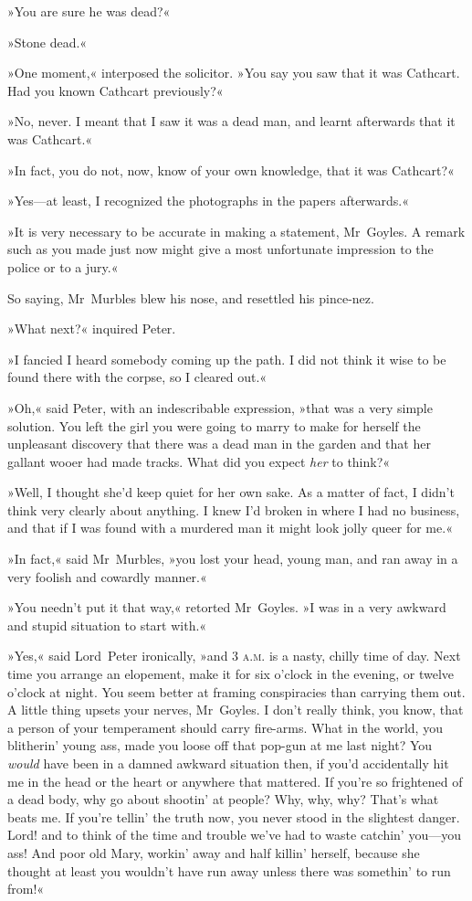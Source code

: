 »You are sure he was dead?«

»Stone dead.«

»One moment,« interposed the solicitor. »You say you saw that it was Cathcart. Had you known Cathcart previously?«

»No, never. I meant that I saw it was a dead man, and learnt afterwards that it was Cathcart.«

»In fact, you do not, now, know of your own knowledge, that it was Cathcart?«

»Yes—at least, I recognized the photographs in the papers afterwards.«

»It is very necessary to be accurate in making a statement, Mr~Goyles.  A remark such as you made just now might give a most unfortunate impression to the police or to a jury.«

So saying, Mr~Murbles blew his nose, and resettled his pince-nez.

»What next?« inquired Peter.

»I fancied I heard somebody coming up the path. I did not think it wise to be found there with the corpse, so I cleared out.«

»Oh,« said Peter, with an indescribable expression, »that was a very simple solution. You left the girl you were going to marry to make for herself the unpleasant discovery that there was a dead man in the garden and that her gallant wooer had made tracks. What did you expect \textit{her} to think?«

»Well, I thought she'd keep quiet for her own sake. As a matter of fact, I didn't think very clearly about anything. I knew I'd broken in where I had no business, and that if I was found with a murdered man it might look jolly queer for me.«

»In fact,« said Mr~Murbles, »you lost your head, young man, and ran away in a very foolish and cowardly manner.«

»You needn't put it that way,« retorted Mr~Goyles. »I was in a very awkward and stupid situation to start with.«

»Yes,« said Lord~Peter ironically, »and 3 \textsc{a.m.} is a nasty, chilly time of day. Next time you arrange an elopement, make it for six o'clock in the evening, or twelve o'clock at night. You seem better at framing conspiracies than carrying them out. A little thing upsets your nerves, Mr~Goyles. I don't really think, you know, that a person of your temperament should carry fire-arms. What in the world, you blitherin' young ass, made you loose off that pop-gun at me last night? You \textit{would} have been in a damned awkward situation then, if you'd accidentally hit me in the head or the heart or anywhere that mattered. If you're so frightened of a dead body, why go about shootin' at people? Why, why, why? That's what beats me. If you're tellin' the truth now, you never stood in the slightest danger. Lord! and to think of the time and trouble we've had to waste catchin' you—you ass! And poor old Mary, workin' away and half killin' herself, because she thought at least you wouldn't have run away unless there was somethin' to run from!«

